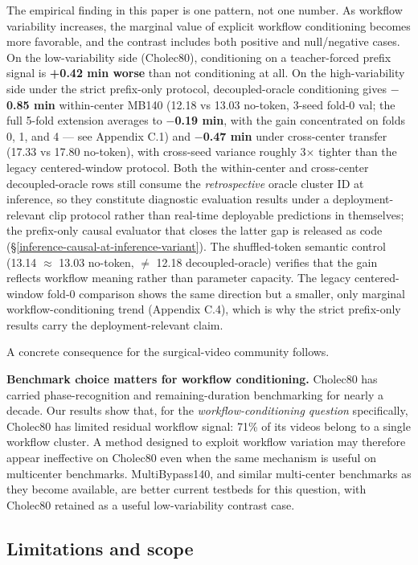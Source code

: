 The empirical finding in this paper is one pattern, not one number. As
workflow variability increases, the marginal value of explicit workflow
conditioning becomes more favorable, and the contrast includes both
positive and null/negative cases. On the low-variability side (Cholec80),
conditioning on a teacher-forced prefix signal is
\textbf{+0.42 min worse} than not conditioning at all. On the
high-variability side under the strict prefix-only protocol,
decoupled-oracle conditioning gives \textbf{$-$0.85 min} within-center
MB140 (12.18 vs 13.03 no-token, 3-seed fold-0 val; the full 5-fold
extension averages to \textbf{$-$0.19 min}, with the gain concentrated on
folds 0, 1, and 4 --- see Appendix C.1) and \textbf{$-$0.47 min}
under cross-center transfer (17.33 vs 17.80 no-token), with cross-seed
variance roughly 3$\times$ tighter than the legacy centered-window protocol.
Both the within-center and cross-center decoupled-oracle rows still
consume the \emph{retrospective} oracle cluster ID at inference, so they
constitute diagnostic evaluation results under a deployment-relevant clip
protocol rather than real-time deployable predictions in themselves; the
prefix-only causal evaluator that closes the latter gap is released as
code (\S\ref{inference-causal-at-inference-variant}). The shuffled-token semantic control (13.14
$\approx$ 13.03 no-token, $\neq$ 12.18 decoupled-oracle) verifies that the gain
reflects workflow meaning rather than parameter capacity. The legacy
centered-window fold-0 comparison shows the same direction but a smaller,
only marginal workflow-conditioning trend (Appendix C.4), which is why
the strict prefix-only results carry the deployment-relevant claim.

A concrete consequence for the surgical-video community follows.

\textbf{Benchmark choice matters for workflow conditioning.} Cholec80 has
carried phase-recognition and remaining-duration benchmarking for nearly
a decade. Our results show that, for the
\emph{workflow-conditioning question} specifically, Cholec80 has limited
residual workflow signal: 71\% of its videos belong to a single workflow
cluster. A method designed to exploit workflow variation may therefore
appear ineffective on Cholec80 even when the same mechanism is useful on
multicenter benchmarks. MultiBypass140, and similar multi-center
benchmarks as they become available, are better current testbeds for
this question, with Cholec80 retained as a useful low-variability
contrast case.

\subsection{Limitations and scope}\label{limitations-and-scope}

